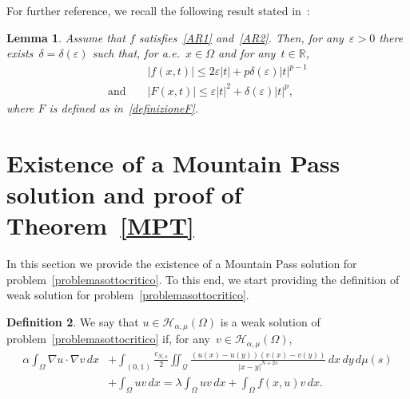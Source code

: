 \documentclass[12pt,a4paper,intlimits,sumlimits]{amsart}
\def \R {\mathbb{R}}
\def \Q {\mathcal Q}
\theoremstyle{definition}
\newtheorem{definition}{Definition}[section]
\theoremstyle{plain}
\newtheorem{lemma}[definition]{Lemma}
\numberwithin{equation}{section}
\renewcommand{\leq}{\leqslant}
\begin{document}
For further reference, we recall the following result stated in~\cite[Lemma~3]{SV12}:

\begin{lemma}\label{SV12}
Assume that $f$ satisfies~\eqref{AR1} and~\eqref{AR2}.
Then, for any~$\varepsilon>0$ there exists~$\delta=\delta(\varepsilon)$ such that, for a.e.~$x\in \Omega$ and for any~$t\in \R$,
\begin{eqnarray}&&
|f(x,t)|\leq 2\varepsilon|t|+p\delta(\varepsilon)|t|^{p-1}\nonumber
\\
{\mbox{and }}&&
\label{F1}
|F(x,t)|\leq \varepsilon|t|^2+\delta(\varepsilon)|t|^{p},
\end{eqnarray}
where $F$ is defined as in~\eqref{definizioneF}.
\end{lemma}

\section{Existence of a Mountain Pass solution
and proof of Theorem~\ref{MPT}}\label{sec:mp}

In this section we provide the existence of a
Mountain Pass solution for problem~\eqref{problemasottocritico}. To this end, we start providing the definition of weak solution for problem~\eqref{problemasottocritico}.

\begin{definition}\label{weakdefn}
We say that $u\in \mathcal{H}_{\alpha, \mu}(\Omega)$ is a weak solution of problem~\eqref{problemasottocritico} if, for any~$v\in  \mathcal{H}_{\alpha, \mu}(\Omega)$,
\begin{equation}\label{weaksolution}
\begin{split}
\alpha \int_\Omega \nabla u\cdot\nabla v\, dx &+\int_{(0, 1)} \frac{c_{N, s}}{2} \iint_{\Q} \frac{(u(x)-u(y))(v(x)-v(y))}{|x-y|^{N+2s}} \,dx\,dy\, d\mu(s)\\
&+\int_\Omega uv\, dx = \lambda\int_\Omega uv\, dx +\int_\Omega f(x, u) v \, dx.
\end{split}
\end{equation}
\end{definition}
\end{document}
